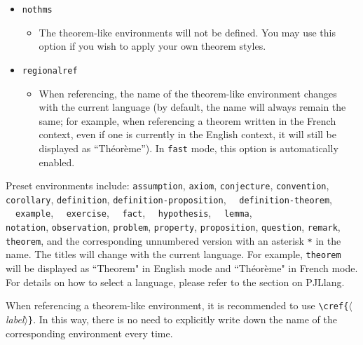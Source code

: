 \documentclass[allowbf,regionalref,puretext]{lebhart}
\providecommand{\meta}[1]{$\langle${\normalfont\itshape#1}$\rangle$}
\newenvironment{tip}[1][Tip]{%
    \begin{tcolorbox}[breakable,
        enhanced,
        width = \textwidth,
        colback = paper, colbacktitle = paper,
        colframe = gray!50, boxrule=0.2mm,
        coltitle = black,
        fonttitle = \sffamily,
        attach boxed title to top left = {yshift=-\tcboxedtitleheight/2, xshift=.5cm},
        boxed title style = {boxrule=0pt, colframe=paper},
        before skip = 0.3cm,
        after skip = 0.3cm,
        top = 3mm,
        bottom = 3mm,
        title={\scshape\sffamily #1}]%
}{\end{tcolorbox}}
\providecommand{\PJLlang}{\textsf{PJLlang}}
\begin{document}
\vspace{-.3\baselineskip}
\begin{itemize}
    \item \texttt{nothms}
    \begin{itemize}
        \item The theorem-like environments will not be defined. You may use this option if you wish to apply your own theorem styles.
    \end{itemize}
    \item \texttt{regionalref}
    \begin{itemize}
        \item When referencing, the name of the theorem-like environment changes with the current language (by default, the name will always remain the same; for example, when referencing a theorem written in the French context, even if one is currently in the English context, it will still be displayed as ``Théorème''). In \texttt{fast} mode, this option is automatically enabled.
    \end{itemize}
\end{itemize}

Preset environments include: \texttt{assumption}, \texttt{axiom}, \texttt{conjecture}, \texttt{convention}, \texttt{corollary}, \texttt{definition}, \texttt{definition-proposition}, ~~\texttt{definition-theorem}, ~~\texttt{example}, ~~\texttt{exercise}, ~~\texttt{fact}, ~~\texttt{hypothesis}, ~~\texttt{lemma}, \\\texttt{notation}, \texttt{observation}, \texttt{problem}, \texttt{property}, \texttt{proposition}, \texttt{question}, \texttt{remark}, \texttt{theorem}, and the corresponding unnumbered version with an asterisk \lstinline|*| in the name. The titles will change with the current language. For example, \texttt{theorem} will be displayed as ``Theorem" in English mode and ``Théorème" in French mode. For details on how to select a language, please refer to the section on \PJLlang{}.

\begin{tip}
    When referencing a theorem-like environment, it is recommended to use \lstinline|\cref{|\meta{label}\texttt{\}}. In this way, there is no need to explicitly write down the name of the corresponding environment every time.
\end{tip}

\medskip
\end{document}
